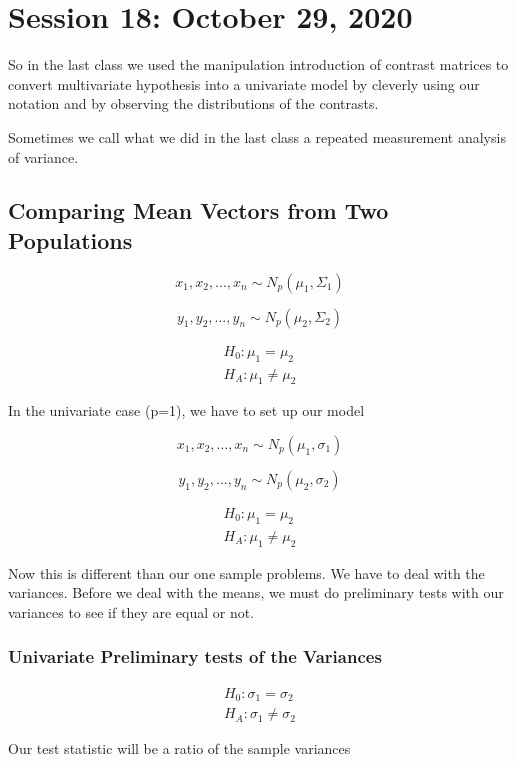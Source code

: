 \chapter{Session 18: October 29, 2020}

So in the last class we used the manipulation introduction of contrast matrices to convert multivariate hypothesis into a univariate model by cleverly using our notation and by observing the distributions of the contrasts.

Sometimes we call what we did in the last class a repeated measurement analysis of variance.

\section{Comparing Mean Vectors from Two Populations}

\[x_1,x_2,...,x_n \sim N_p(\mu_1,\Sigma_1)\]

\[y_1,y_2,...,y_n \sim N_p(\mu_2,\Sigma_2)\]

\begin{gather*}
    H_0 : \mu_1 = \mu_2\\
    H_A : \mu_1 \neq \mu_2
\end{gather*}

In the univariate case (p=1), we have to set up our model

\[x_1,x_2,...,x_n \sim N_p(\mu_1,\sigma_1)\]

\[y_1,y_2,...,y_n \sim N_p(\mu_2,\sigma_2)\]

\begin{gather*}
    H_0 : \mu_1 = \mu_2\\
    H_A : \mu_1 \neq \mu_2
\end{gather*}

Now this is different than our one sample problems. We have to deal with the variances. Before we deal with the means, we must do preliminary tests with our variances to see if they are equal or not.

\subsection{Univariate Preliminary tests of the Variances}

\begin{gather*}
    H_0 : \sigma_1 = \sigma_2\\
    H_A : \sigma_1 \neq \sigma_2
\end{gather*}

Our test statistic will be a ratio of the sample variances

